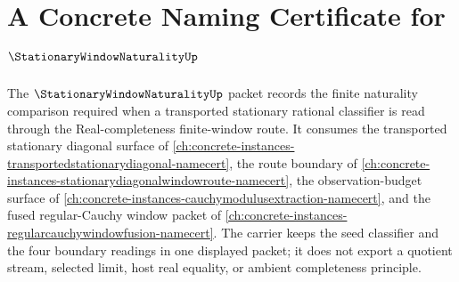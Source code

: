 \chapter{A Concrete Naming Certificate for $\StationaryWindowNaturalityUp$}
\label{ch:concrete-instances-stationarywindownaturality-namecert}

The $\StationaryWindowNaturalityUp$ packet records the finite naturality comparison required when a transported stationary rational classifier is read through the Real-completeness finite-window route. It consumes the transported stationary diagonal surface of \autoref{ch:concrete-instances-transportedstationarydiagonal-namecert}, the route boundary of \autoref{ch:concrete-instances-stationarydiagonalwindowroute-namecert}, the observation-budget surface of \autoref{ch:concrete-instances-cauchymodulusextraction-namecert}, and the fused regular-Cauchy window packet of \autoref{ch:concrete-instances-regularcauchywindowfusion-namecert}. The carrier keeps the seed classifier and the four boundary readings in one displayed packet; it does not export a quotient stream, selected limit, host real equality, or ambient completeness principle.



